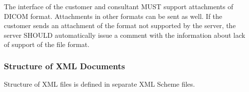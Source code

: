 \documentclass[a4paper]{article}
\begin{document}
The interface of the customer and consultant MUST support attachments of DICOM format. 
Attachments in other formats can be sent as well. If the customer sends an attachment of the 
format not supported by the server, the server SHOULD automatically issue a comment with the 
information about lack of support of the file format.

\subsubsection{Structure of XML Documents}

Structure of XML files is defined in separate XML Scheme files.
\end{document}
